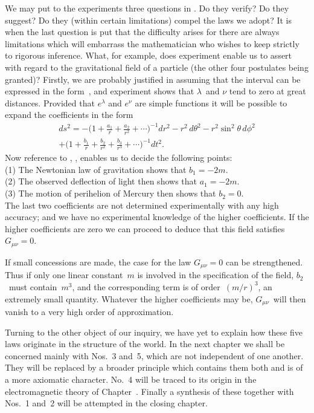 \documentclass[12pt]{book}
\begin{document}
We may put to the experiments three questions in . Do they
%
%
%
verify? Do they suggest? Do they (within certain limitations) compel the
laws we adopt? It is when the last question is put that the difficulty arises
for there are always limitations which will embarrass the mathematician who
wishes to keep strictly to rigorous inference. What, for example, does experiment
enable us to assert with regard to the gravitational field of a particle
(the other four postulates being granted)? Firstly, we are probably justified
in assuming that the interval can be expressed in the form~, and experiment
shows that $\lambda$~and $\nu$ tend to zero at great distances. Provided that $e^{\lambda}$ and
$e^{\nu}$ are simple functions it will be possible to expand the coefficients in the form
\begin{multline*}
  ds^{2} = -\biggl(1 + \frac{a_{1}}{r} + \frac{a_{2}}{r^{2}} + \cdots\biggr)^{-1} dr^{2}
  - r^{2}\, d\theta^2 - r^{2}\sin^{2}\theta\, d\phi^{2} \\
  + \biggl(1 + \frac{b_{1}}{r} + \frac{b_{2}}{r^{2}} + \frac{b_{3}}{r^{3}} + \cdots\biggr)^{-1} dt^{2}.
\end{multline*}
Now reference to , ,  enables us to decide the following points: \\
\Indent (1) The Newtonian law of gravitation shows that $b_{1} = -2m$. \\
\Indent (2) The observed deflection of light then shows that $a_{1} = -2m$. \\
\Indent (3) The motion of perihelion of Mercury then shows that $b_{2} = 0$. \\
The last two coefficients are not determined experimentally with any high
accuracy; and we have no experimental knowledge of the higher coefficients.
If the higher coefficients are zero we can proceed to deduce that this field
satisfies $G_{\mu\nu} = 0$.

If small concessions are made, the case for the law $G_{\mu\nu} = 0$ can be
strengthened. Thus if only one linear constant~$m$ is involved in the specification
of the field, $b_{2}$~must contain~$m^{3}$, and the corresponding term is of order~$(m/r)^{3}$,
an extremely small quantity. Whatever the higher coefficients may
be, $G_{\mu\nu}$~will then vanish to a very high order of approximation.

Turning to the other object of our inquiry, we have yet to explain how
these five laws originate in the structure of the world. In the next chapter
we shall be concerned mainly with Nos.~3 and~5, which are not independent
of one another. They will be replaced by a broader principle which contains
them both and is of a more axiomatic character. No.~4 will be traced to its
origin in the electromagnetic theory of Chapter~\@. Finally a synthesis of
these together with Nos.~1 and~2 will be attempted in the closing chapter.
\end{document}
